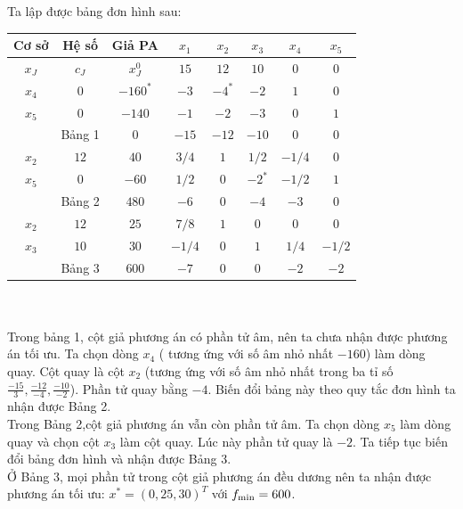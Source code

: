 \documentclass[12pt,a4paper]{report}
\begin{document}
\begin{itemize}
    Ta lập được bảng đơn hình sau:\\
    \begin{tabular}{|c|c|c|c|c|c|c|c|}
       \hline
       Cơ sở  & Hệ số & Giả PA& $x_1$ & $x_2$ & $x_3$ &$x_4$ & $x_5$ \\
       \hline
        $x_J$ & $c_J$ & $x_J^0$ & $15$ &$12$ &$10$ &$0$ &$0$ \\
        \hline
        $x_4$ & $0$ & $-160^*$ & $-3$ &$-4^*$ &$-2$ &$1$ &$0$\\
        $x_5$ & $0$ & $-140$ &$-1$ &$-2$ &$-3$ &$0$ &$1$\\
        \hline
        &Bảng 1 & $0$ & $-15$ &$-12$ &$-10$ &$0$ &$0$\\
        \hline
        $x_2$& $12$ &$40$ & $3/4$ &$1$ &$1/2$ &$-1/4$ &$0$\\
        $x_5$ &$0$ & $-60$ &$1/2$ &$0$ &$-2^*$ &$-1/2$ &$1$\\
        \hline
        &Bảng 2& $480$ &$-6$ &$0$ &$-4$ &$-3$ &$0$\\
        \hline
        $x_2$ &$12$ &$25$ &$7/8$ & $1$ &$0$ &$0 $ &$0$\\
        $x_3$ &$10$ &$30$ &$-1/4$ &$0$ &$1$ &$1/4$ &$-1/2$\\
        \hline
        &Bảng 3& $600$ &$-7$ &$0 $ &$0$ &$-2$ &$-2$\\
        \hline
    \end{tabular}\\
    \\
      Trong bảng 1, cột giả phương án có phần tử âm, nên ta chưa nhận được phương án tối ưu. Ta chọn dòng $x_4$  ( tương ứng với số âm nhỏ nhất $-160$) làm dòng quay. Cột quay là cột $x_2$ (tương ứng với số âm nhỏ nhất trong ba tỉ số $\frac{-15}{3},\frac{-12}{-4},\frac{-10}{-2}$). Phần tử quay bằng $-4$. Biến đổi bảng này theo quy tắc đơn hình ta nhận được Bảng 2.\\
    Trong Bảng 2,cột giả phương án vẫn còn phần tử âm. Ta chọn dòng $x_5$ làm dòng quay và chọn cột $x_3$ làm cột quay. Lúc này phần tử quay là $-2$. Ta tiếp tục biến đổi bảng đơn hình và nhận được Bảng 3. \\
    Ở Bảng 3, mọi phần tử trong cột giả phương án đều dương nên ta nhận được phương án tối ưu: $x^*=(0,25,30)^T$ với $f_{\rm{min}}=600$.\\
    
\end{itemize}
\end{document}

